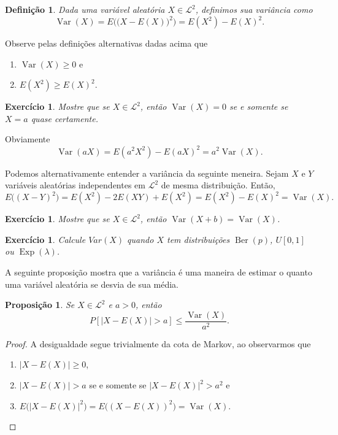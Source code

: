 \documentclass[reqno]{article}
\newcommand*\1{\mathds{1}}
\newtheorem{proposition}[theorem]{Proposição}
\newtheorem{definition}[theorem]{Definição}
\DeclareMathOperator{\Var}{Var}
\DeclareMathOperator{\Ber}{Ber}
\DeclareMathOperator{\Exp}{Exp}
\newtheorem{exercise}[example]{Exercício}
\begin{document}
\begin{definition}
  Dada uma variável aleatória $X \in \mathcal{L}^2$, definimos sua variância como
  \begin{equation}
    \Var(X) = E \Big( \big(X - E(X)\big)^2 \Big) = E(X^2) - E(X)^2.
  \end{equation}
\end{definition}

Observe pelas definições alternativas dadas acima que
\begin{enumerate}
\item $\Var(X) \geq 0$ e
\item $E(X^2) \geq E(X)^2$.
\end{enumerate}

\begin{exercise}
  Mostre que se $X \in \mathcal{L}^2$, então $\Var(X) = 0$ se e somente se $X = a$ quase certamente.
\end{exercise}

Obviamente
\begin{equation}
  \Var(a X) = E(a^2 X^2) - E(aX)^2 = a^2 \Var(X).
\end{equation}

Podemos alternativamente entender a variância da seguinte meneira.
Sejam $X$ e $Y$ variáveis aleatórias independentes em $\mathcal{L}^2$ de mesma distribuição.
Então,
\begin{equation}
  E\big( (X - Y)^2 \big) = E(X^2) - 2 E(XY) + E(X^2) = E(X^2) - E(X)^2 = \Var(X).
\end{equation}

\begin{exercise}
  Mostre que se $X \in \mathcal{L}^2$, então $\Var(X + b) = \Var(X)$.
\end{exercise}

\begin{exercise}
  Calcule $Var(X)$ quando $X$ tem distribuições $\Ber(p)$, $U[0,1]$ ou $\Exp(\lambda)$.
\end{exercise}

A seguinte proposição mostra que a variância é uma maneira de estimar o quanto uma variável aleatória se desvia de sua média.
\begin{proposition}
  Se $X \in \mathcal{L}^2$ e $a > 0$, então
  \begin{equation}
    P [ |X - E(X)| > a] \leq \frac{\Var(X)}{a^2}.
  \end{equation}
\end{proposition}

\begin{proof}
  A desigualdade segue trivialmente da cota de Markov, ao observarmos que
  \begin{enumerate}
  \item $|X - E(X)| \geq 0$,
  \item $|X - E(X)| > a$ se e somente se $|X - E(X)|^2 > a^2$ e
  \item $E\big(|X - E(X)|^2\big) = E\big((X - E(X))^2\big) = \Var(X)$.
  \end{enumerate}
\end{proof}
\end{document}
